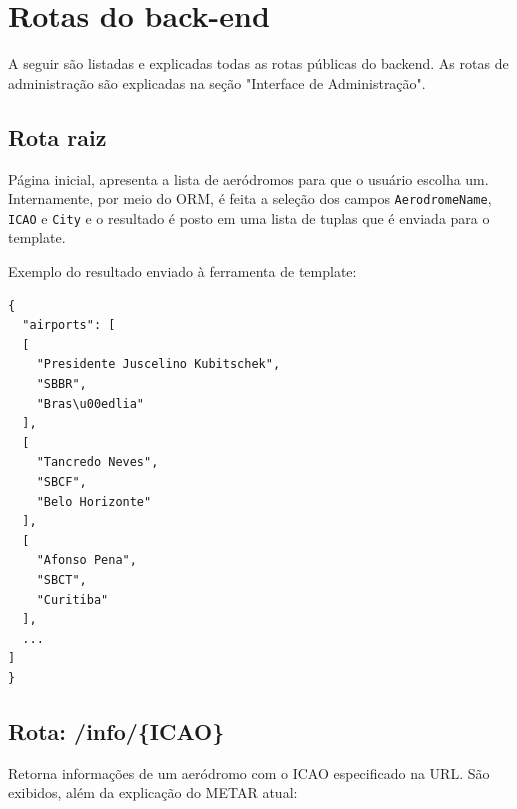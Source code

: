 \chapter{Rotas do back-end}

A seguir são listadas e explicadas todas as rotas públicas do backend. As
rotas de administração são explicadas na seção "Interface de Administração".

\section{Rota raiz}

Página inicial, apresenta a lista de aeródromos para que o usuário escolha um. 
Internamente, por meio do ORM, é feita a seleção dos campos \texttt{AerodromeName},
\texttt{ICAO} e \texttt{City} e o resultado é posto em uma lista de tuplas que é 
enviada para o template.

Exemplo do resultado enviado à ferramenta de template:
\begin{smaller}
\begin{verbatim}
{
  "airports": [
  [
    "Presidente Juscelino Kubitschek",
    "SBBR",
    "Bras\u00edlia"
  ],
  [
    "Tancredo Neves",
    "SBCF",
    "Belo Horizonte"
  ],
  [
    "Afonso Pena",
    "SBCT",
    "Curitiba"
  ],
  ...
]
}
\end{verbatim}
\end{smaller}


\section{Rota: /info/\{ICAO\}}

Retorna informações de um aeródromo com o ICAO especificado na URL. São exibidos,
além da explicação do METAR atual:

